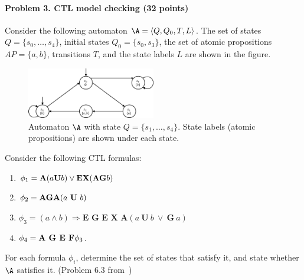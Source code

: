 \documentclass[11pt]{article}
\begin{document}
\paragraph{Problem 3. CTL model checking (32 points)}
	\label{ex:CTL:mc}
	Consider the following automaton $\A = \langle Q, Q_0, T, L\rangle$. The set of states $Q = \{s_0,\ldots, s_4\}$, initial states $Q_0 = \{s_0, s_3\}$, the set of atomic propositions $AP = \{a,b\}$, transitions $T$, and the state labels $L$ are shown in the figure.
\begin{figure}[h!]
\centering
	\includegraphics[width=0.5\textwidth]{ctl.png}
	\caption{Automaton $\A$ with state $Q = \{s_1, \ldots, s_4\}$. State labels (atomic propositions) are shown under each state.}
\end{figure}

Consider the following CTL formulas:
	\begin{enumerate}
		\item $\phi_1 = {\bf A }(a {\bf U} b) \vee {\bf E X} ({\bf AG} b) $
		\item $\phi_2 = {\bf A G A} (a\ {\bf U}\ b)$
		\item $\phi_3 = (a \wedge b) \Rightarrow \textbf{E G E X A} (a \ \textbf{U}\ b \ \vee\ \textbf{G}\ a)$
		\item $\phi_4 = \textbf{A G E F\/} \phi_3$.
	\end{enumerate}
	For each formula $\phi_i$, determine the set of states that satisfy it, and state whether $\A$ satisfies it.
	(Problem 6.3 from~\cite{Baier:2008:PMC})
\end{document}
